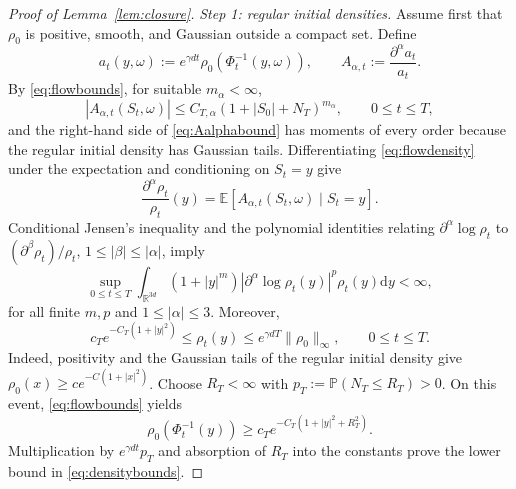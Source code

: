 \documentclass[11pt]{article}
\theoremstyle{definition}
\newcommand{\R}{\mathbb R}
\newcommand{\E}{\mathbb E}
\newcommand{\dd}{\mathrm d}
\begin{document}
\begin{proof}[Proof of Lemma~\ref{lem:closure}]
\smallskip
\noindent\emph{Step 1: regular initial densities.}
Assume first that $\rho_0$ is positive, smooth, and Gaussian outside a compact
set. Define
\[
 a_t(y,\omega):=e^{\gamma dt}\rho_0\left(\Phi_t^{-1}(y,\omega)\right),
 \qquad A_{\alpha,t}:=\frac{\partial^\alpha a_t}{a_t}.
\]
By \eqref{eq:flowbounds}, for suitable $m_\alpha<\infty$,
\begin{equation}\label{eq:Aalphabound}
 |A_{\alpha,t}(S_t,\omega)|
 \leq C_{T,\alpha}(1+|S_0|+N_T)^{m_\alpha},\qquad 0\leq t\leq T,
\end{equation}
and the right-hand side of \eqref{eq:Aalphabound}
has moments of every order because the regular
initial density has Gaussian tails. Differentiating
\eqref{eq:flowdensity} under the expectation and conditioning on $S_t=y$ give
\[
 \frac{\partial^\alpha\rho_t}{\rho_t}(y)
   =\E[A_{\alpha,t}(S_t,\omega)\mid S_t=y].
\]
Conditional Jensen's inequality and the polynomial identities relating
$\partial^\alpha\log\rho_t$ to
$(\partial^\beta\rho_t)/\rho_t$, $1\leq|\beta|\leq|\alpha|$, imply
\begin{equation}\label{eq:logdensitybounds}
 \sup_{0\leq t\leq T}\int_{\R^{3d}}(1+|y|^m)
 |\partial^\alpha\log\rho_t(y)|^p\rho_t(y)\dd y<\infty,
\end{equation}
for all finite $m,p$ and $1\leq|\alpha|\leq3$. Moreover,
\begin{equation}\label{eq:densitybounds}
 c_Te^{-C_T(1+|y|^2)}\leq\rho_t(y)
 \leq e^{\gamma dT}\|\rho_0\|_\infty,
 \qquad 0\leq t\leq T.
\end{equation}
Indeed, positivity and the Gaussian tails of the regular initial density give
$\rho_0(x)\geq c e^{-C(1+|x|^2)}$. Choose $R_T<\infty$ with
$p_T:=\mathbb P(N_T\leq R_T)>0$. On this event, \eqref{eq:flowbounds} yields
\[
 \rho_0\left(\Phi_t^{-1}(y)\right)
 \geq c_Te^{-C_T(1+|y|^2+R_T^2)}.
\]
Multiplication by $e^{\gamma dt}p_T$ and absorption of $R_T$ into the constants
prove the lower bound in \eqref{eq:densitybounds}.


\end{proof}
\end{document}
